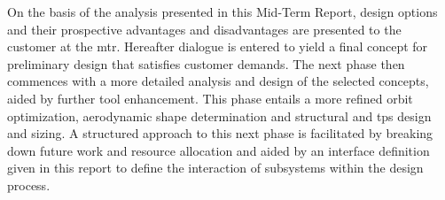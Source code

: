 \newline
\newline
On the basis of the analysis presented in this Mid-Term Report, design options and their prospective advantages and disadvantages are presented to the customer at the \gls{mtr}. Hereafter dialogue is entered to yield a final concept for preliminary design that satisfies customer demands. The next phase then commences with a more detailed analysis and design of the selected concepts, aided by further tool enhancement. This phase entails a more refined orbit optimization, aerodynamic shape determination and structural and \gls{tps} design and sizing. A structured approach to this next phase is facilitated by breaking down future work and resource allocation and aided by an interface definition given in this report to define the interaction of subsystems within the design process.